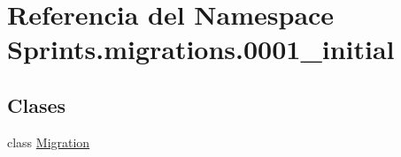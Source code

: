\hypertarget{namespace_sprints_1_1migrations_1_10001__initial}{}\section{Referencia del Namespace Sprints.\+migrations.0001\+\_\+initial}
\label{namespace_sprints_1_1migrations_1_10001__initial}
\subsection*{Clases}
\begin{DoxyCompactItemize}
\item 
class \hyperlink{class_sprints_1_1migrations_1_10001__initial_1_1_migration}{Migration}
\end{DoxyCompactItemize}
